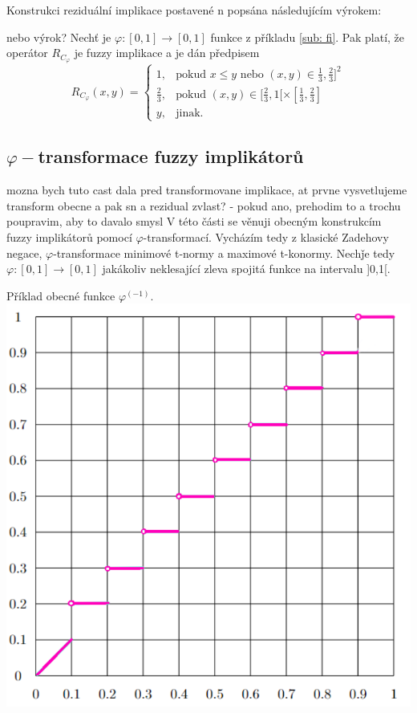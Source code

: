 Konstrukci reziduální implikace postavené n popsána následujícím výrokem:

\begin{sentence}
    {\color{blue} nebo výrok?}
    Nech\v t je $\varphi:[0,1]\rightarrow [0,1]$
funkce z příkladu \ref{sub: fi}.
Pak platí, že operátor $R_{C_{\varphi}}$ je fuzzy implikace a je dán předpisem
$$ R_{C_{\varphi}}(x,y) = \begin{cases} 1, & \mbox{pokud } x\leq y \mbox{ nebo } (x,y) \in \frac{1}{3},\frac{2}{3}]^2\\
\frac{2}{3}, &\mbox {pokud }
(x,y)\in [\frac{2}{3},1[\times[\frac{1}{3},\frac{2}{3}]
\\ y, &\mbox {jinak.}
\end{cases} $$
\end{sentence}


\subsection{$\varphi-$transformace fuzzy implik\'ator\r u} 
{\color{blue}mozna bych tuto cast dala pred transformovane implikace, at prvne vysvetlujeme transform obecne a pak sn a rezidual zvlast? - pokud ano, prehodim to a trochu poupravim, aby to davalo smysl}
V této části se věnuji obecným konstrukcím fuzzy implikátor\r u pomocí $\varphi$-transformací. Vycházím tedy z klasické Zadehovy negace, $\varphi$-transformace minimové t-normy a maximové t-konormy.
Nech\v je tedy $\varphi: [0,1] \to [0,1]$ jakákoliv neklesající zleva spojitá funkce na intervalu ]0,1[.
\begin{graph}
    Příklad obecné funkce $\varphi^{(-1)}$.\\
    \centering
        \includegraphics[scale=0.6]{template-fig/basic.pdf}
\end{graph}

